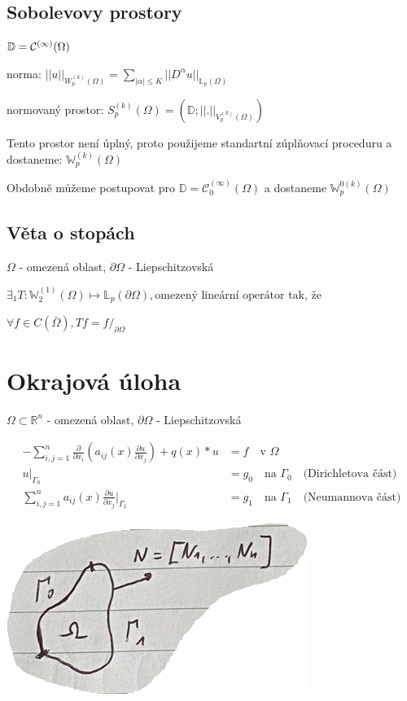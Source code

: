 \documentclass[../main.tex]{subfiles}
\begin{document}
\subsection{Sobolevovy prostory }

$\mathbb{D} = \mathcal{C}^{(\infty)}(\Omega)$

norma:
$||u||_{W_p^{(k)}(\Omega)} = \sum_{|\alpha| \leq K} ||D^\alpha u||_{\mathbb{L}_p(\Omega)}$

normovaný prostor: $S^{(k)}_p(\Omega) = (\mathbb{D}; ||.||_{V_p^{(k)}(\Omega)})$

Tento prostor není úplný, proto použijeme standartní zúplňovací proceduru a dostaneme:
$\mathbb{W}_p^{(k)}(\Omega)$

Obdobně můžeme postupovat pro $\mathbb{D} = \mathcal{C}^{(\infty)}_0(\Omega)$ a dostaneme $\mathbb{W}_p^{0 (k)}(\Omega)$

\subsection{Věta o stopách}

$\Omega$ - omezená oblast, $\partial \Omega$ - Liepschitzovská

$\exists_1 T: \mathbb{W}_2^{(1)}(\Omega) \mapsto \mathbb{L}_p (\partial \Omega), \text{omezený lineární operátor tak, že}$

$ \forall f\in C (\bar \Omega), Tf = f /_{\partial \Omega} $



\section{Okrajová úloha}
$\Omega\subset\mathbb{R}^n$ - omezená oblast, $\partial \Omega$ - Liepschitzovská

\begin{align}\label{eq:okraj}
    - \sum_{i,j = 1}^{n} \frac{\partial}{\partial x_i} \left ( a_{ij}(x) \frac{\partial u}{\partial x_j}\right ) + q(x)*u &= f \quad \text{v } \Omega
    \\ \label{eq:PP1}
    u|_{\Gamma_0} &= g_0 \quad \text{na } \Gamma_0 \quad \text{(Dirichletova část)}
    \\ \label{eq:PP2}
    \sum_{i,j=1}^{n}a_{ij} (x) \frac{\partial u}{\partial x_j} |_{\Gamma_1} &= g_1 \quad \text{na } \Gamma_1 \quad \text{(Neumannova část)}
\end{align}

\includegraphics{images/oblast.PNG}
\end{document}
